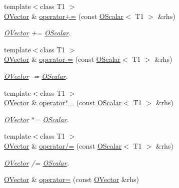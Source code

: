 \begin{DoxyCompactItemize}
{\footnotesize template$<$class T1 $>$ }\\\mbox{\hyperlink{classENSEM_1_1OVector}{O\+Vector}} \& \mbox{\hyperlink{classENSEM_1_1OVector_a6cb710cbb29083f2849c48da65292174}{operator+=}} (const \mbox{\hyperlink{classENSEM_1_1OScalar}{O\+Scalar}}$<$ T1 $>$ \&rhs)
\begin{DoxyCompactList}\small\item\em \mbox{\hyperlink{classENSEM_1_1OVector}{O\+Vector}} += \mbox{\hyperlink{classENSEM_1_1OScalar}{O\+Scalar}}. \end{DoxyCompactList}\item 
{\footnotesize template$<$class T1 $>$ }\\\mbox{\hyperlink{classENSEM_1_1OVector}{O\+Vector}} \& \mbox{\hyperlink{classENSEM_1_1OVector_ae2ae62360c5eb29827cb7e3d5556859f}{operator-\/=}} (const \mbox{\hyperlink{classENSEM_1_1OScalar}{O\+Scalar}}$<$ T1 $>$ \&rhs)
\begin{DoxyCompactList}\small\item\em \mbox{\hyperlink{classENSEM_1_1OVector}{O\+Vector}} -\/= \mbox{\hyperlink{classENSEM_1_1OScalar}{O\+Scalar}}. \end{DoxyCompactList}\item 
{\footnotesize template$<$class T1 $>$ }\\\mbox{\hyperlink{classENSEM_1_1OVector}{O\+Vector}} \& \mbox{\hyperlink{classENSEM_1_1OVector_a55710cffaf6c877d2465af80ad8b6c49}{operator$\ast$=}} (const \mbox{\hyperlink{classENSEM_1_1OScalar}{O\+Scalar}}$<$ T1 $>$ \&rhs)
\begin{DoxyCompactList}\small\item\em \mbox{\hyperlink{classENSEM_1_1OVector}{O\+Vector}} $\ast$= \mbox{\hyperlink{classENSEM_1_1OScalar}{O\+Scalar}}. \end{DoxyCompactList}\item 
{\footnotesize template$<$class T1 $>$ }\\\mbox{\hyperlink{classENSEM_1_1OVector}{O\+Vector}} \& \mbox{\hyperlink{classENSEM_1_1OVector_aa26be39a0620d0cdc1685bc2f1cc31a5}{operator/=}} (const \mbox{\hyperlink{classENSEM_1_1OScalar}{O\+Scalar}}$<$ T1 $>$ \&rhs)
\begin{DoxyCompactList}\small\item\em \mbox{\hyperlink{classENSEM_1_1OVector}{O\+Vector}} /= \mbox{\hyperlink{classENSEM_1_1OScalar}{O\+Scalar}}. \end{DoxyCompactList}\item 
\mbox{\hyperlink{classENSEM_1_1OVector}{O\+Vector}} \& \mbox{\hyperlink{classENSEM_1_1OVector_af1d768a4392ac2caf7d93faef7b39ed2}{operator=}} (const \mbox{\hyperlink{classENSEM_1_1OVector}{O\+Vector}} \&rhs)

\end{DoxyCompactItemize}
